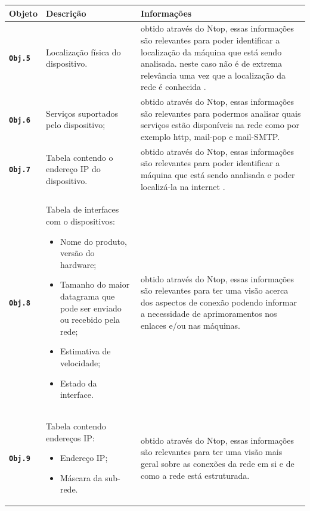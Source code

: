 \documentclass[a4paper]{article}
\begin{document}
   \begin{table}[H]
    \begin{tabu} to 
    \everyrow{\tabucline[.2pt]-}
    \rowfont\bfseries
    Objeto  & Descrição & Informações \\  \hline
    
   \texttt{Obj.5}  & Localização física do dispositivo.
 & obtido através do Ntop, essas informações são relevantes para poder identificar a localização da máquina que está sendo analisada. neste caso não é de extrema relevância uma vez que a localização da rede é conhecida . \\ 
 	 \texttt{Obj.6}  &Serviços suportados pelo dispositivo;
 & obtido através do Ntop, essas informações são relevantes para podermos analisar quais serviços estão disponíveis na rede como por exemplo http, mail-pop e mail-SMTP. \\ 
 	\texttt{Obj.7}  &Tabela contendo o endereço IP do dispositivo.
 & obtido através do Ntop, essas informações são relevantes para poder identificar a máquina que está sendo analisada e poder localizá-la na internet . \\
 	\texttt{Obj.8}  & Tabela de interfaces com o dispositivos:
    \begin{itemize}
	\item Nome do produto, versão do hardware;
    \item Tamanho do maior datagrama que pode ser enviado ou recebido pela rede;
    \item Estimativa de velocidade;
    \item Estado da interface.
\end{itemize}
 & obtido através do Ntop, essas informações são relevantes para ter uma visão acerca dos  aspectos de conexão podendo informar a necessidade de aprimoramentos nos enlaces e/ou nas máquinas.\\
 \texttt{Obj.9}  &Tabela contendo endereços IP:
    \begin{itemize}
	\item Endereço IP;
    \item Máscara da sub-rede.
\end{itemize}
 &  obtido através do Ntop, essas informações são relevantes para ter uma visão mais geral sobre as conexões da rede em si e de como a rede está estruturada. \\ 
   
    \end{tabu}
    \end{table}
  
\end{document}
